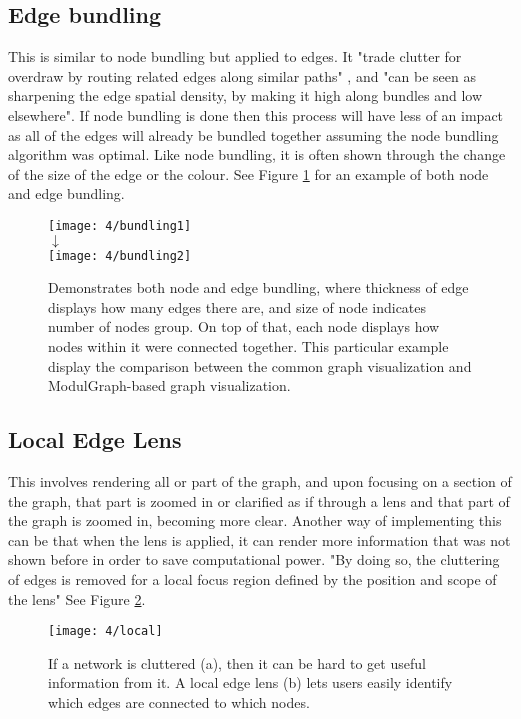 \documentclass[../dissertation.tex]{subfiles}
\begin{document}
\subsection{Edge bundling}
\label{sec:edge_bundling}
This is similar to node bundling but applied to edges. It "trade clutter for overdraw by routing related edges along similar paths" \cite{hurter2012graph}, and "can be seen as sharpening the edge spatial density, by making it high along bundles and low elsewhere"\cite{hurter2012graph}. If node bundling is done then this process will have less of an impact as all of the edges will already be bundled together assuming the node bundling algorithm was optimal. Like node bundling, it is often shown through the change of the size of the edge or the colour. See Figure \ref{fig:bundling} for an example of both node and edge bundling.
\begin{figure}
    \centering
    \texttt{[image: 4/bundling1]}
    \\$\downarrow$\\
    \texttt{[image: 4/bundling2]}
    \caption{Demonstrates both node and edge bundling, where thickness of edge displays how many edges there are, and size of node indicates number of nodes group. On top of that, each node displays how nodes within it were connected together. This particular example display the comparison between the common graph visualization and ModulGraph-based graph visualization. \cite{li2015modulgraph}}
    \label{fig:bundling}
\end{figure}

\subsection{Local Edge Lens}
This involves rendering all or part of the graph, and upon focusing on a section of the graph, that part is zoomed in or clarified as if through a lens and that part of the graph is zoomed in, becoming more clear. Another way of implementing this can be that when the lens is applied, it can render more information that was not shown before in order to save computational power. "By doing so, the cluttering of edges is removed for a local focus region defined by the position and scope of the lens" \cite{tominski2006fisheye} See Figure \ref{fig:local}.
\begin{figure}
    \centering
    \texttt{[image: 4/local]}
    \caption{If a network is cluttered (a), then it can be hard to get useful information from it. A local edge lens (b) lets users easily identify which edges are connected to which nodes. \cite{tominski2006fisheye}}
    \label{fig:local}
\end{figure}
\end{document}
